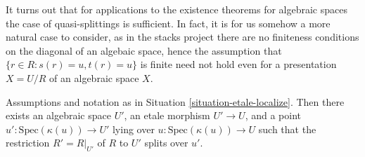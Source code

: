 \noindent
It turns out that for applications to the existence theorems for algebraic
spaces the case of quasi-splittings is sufficient. In fact, it is for us
somehow a more natural case to consider, as in the stacks project there
are no finiteness conditions on the diagonal of an algebaic space, hence
the assumption that $\{r \in R : s(r) = u, t(r) = u\}$ is finite need
not hold even for a presentation $X = U/R$ of an algebraic space $X$.

\begin{lemma}
\label{lemma-splitting-general}
Assumptions and notation as in
Situation \ref{situation-etale-localize}.
Then there exists an algebraic space $U'$, an etale morphism
$U' \to U$, and a point $u' : \text{Spec}(\kappa(u)) \to U'$
lying over $u : \text{Spec}(\kappa(u)) \to U$
such that the restriction $R' = R|_{U'}$ of $R$ to $U'$
splits over $u'$.
\end{lemma}


